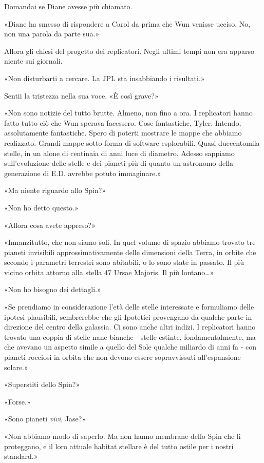 Domandai se Diane avesse più chiamato.

«Diane ha smesso di rispondere a Carol da prima che Wun venisse ucciso.
No, non una parola da parte sua.»

Allora gli chiesi del progetto dei replicatori. Negli ultimi tempi non
era apparso niente sui giornali.

«Non disturbarti a cercare. La JPL sta insabbiando i risultati.»

Sentii la tristezza nella sua voce. «È così grave?»

«Non sono notizie del tutto brutte. Almeno, non fino a ora. I
replicatori hanno fatto tutto ciò che Wun sperava facessero. Cose
fantastiche, Tyler. Intendo, assolutamente fantastiche. Spero di poterti
mostrare le mappe che abbiamo realizzato. Grandi mappe sotto forma di
software esplorabili. Quasi duecentomila stelle, in un alone di
centinaia di anni luce di diametro. Adesso sappiamo sull'evoluzione
delle stelle e dei pianeti più di quanto un astronomo della generazione
di E.D. avrebbe potuto immaginare.»

«Ma niente riguardo allo Spin?»

«Non ho detto questo.»

«Allora cosa avete appreso?»

«Innanzitutto, che non siamo soli. In quel volume di spazio abbiamo
trovato tre pianeti invisibili approssimativamente delle dimensioni
della Terra, in orbite che secondo i parametri terrestri sono abitabili,
o lo sono state in passato. Il più vicino orbita attorno alla stella 47
Ursae Majoris. Il più lontano\ldots»

«Non ho bisogno dei dettagli.»

«Se prendiamo in considerazione l'età delle stelle interessate e
formuliamo delle ipotesi plausibili, sembrerebbe che gli Ipotetici
provengano da qualche parte in direzione del centro della galassia. Ci
sono anche altri indizi. I replicatori hanno trovato una coppia di
stelle nane bianche - stelle estinte, fondamentalmente, ma che avevano
un aspetto simile a quello del Sole qualche miliardo di anni fa - con
pianeti rocciosi in orbita che non devono essere sopravvissuti
all'espansione solare.»

«Superstiti dello Spin?»

«Forse.»

«Sono pianeti \emph{vivi}, Jase?»

«Non abbiamo modo di saperlo. Ma non hanno membrane dello Spin che li
proteggano, e il loro attuale habitat stellare è del tutto ostile per i
nostri standard.»

